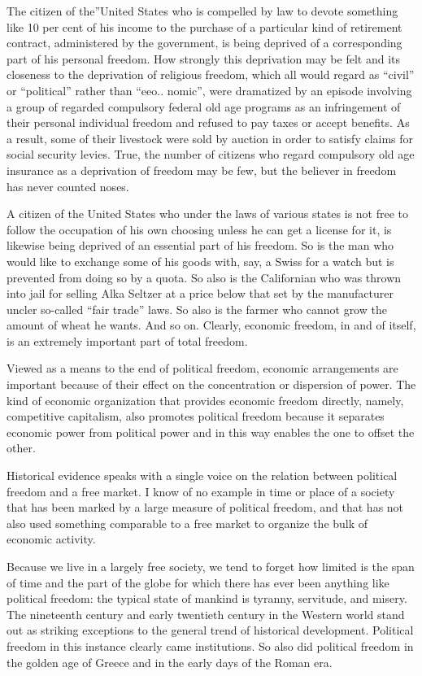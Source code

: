 \documentclass[11pt,openany]{book}
\begin{document}
The citizen of the''United States who is compelled by law to devote something like 10 per cent of his income to the purchase of a particular kind of retirement contract, administered by the government, is being deprived of a corresponding part of his personal freedom. How strongly this deprivation may be felt and its closeness to the deprivation of religious freedom, which all would regard as ``civil'' or ``political'' rather than ``eeo.. nomic'', were dramatized by an episode involving a group of regarded compulsory federal old age programs as an infringement of their personal individual freedom and refused to pay taxes or accept benefits. As a result, some of their livestock were sold by auction in order to satisfy claims for social security levies. True, the number of citizens who regard compulsory old age insurance as a deprivation of freedom may be few, but the believer in freedom has never counted noses.

A citizen of the United States who under the laws of various states is not free to follow the occupation of his own choosing unless he can get a license for it, is likewise being deprived of an essential part of his freedom. So is the man who would like to exchange some of his goods with, say, a Swiss for a watch but is prevented from doing so by a quota. So also is the Californian who was thrown into jail for selling Alka Seltzer at a price below that set by the manufacturer uncler so-called ``fair trade'' laws. So also is the farmer who cannot grow the amount of wheat he wants. And so on. Clearly, economic freedom, in and of itself, is an extremely important part of total freedom.

Viewed as a means to the end of political freedom, economic arrangements are important because of their effect on the concentration or dispersion of power. The kind of economic organization that provides economic freedom directly, namely, competitive capitalism, also promotes political freedom because it separates economic power from political power and in this way enables the one to offset the other.

Historical evidence speaks with a single voice on the relation between political freedom and a free market. I know of no example in time or place of a society that has been marked by a large measure of political freedom, and that has not also used something comparable to a free market to organize the bulk of economic activity.

Because we live in a largely free society, we tend to forget how limited is the span of time and the part of the globe for which there has ever been anything like political freedom: the typical state of mankind is tyranny, servitude, and misery. The nineteenth century and early twentieth century in the Western world stand out as striking exceptions to the general trend of historical development. Political freedom in this instance clearly came institutions. So also did political freedom in the golden age of Greece and in the early days of the Roman era.
\end{document}

